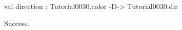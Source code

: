 \runverbatimtrue
{}
\begin{RunVerbatimMsg}
val direction : Tutorial0030.color -D-> Tutorial0030.dir
\end{RunVerbatimMsg}
\begin{RunVerbatimErr}
Success.
\end{RunVerbatimErr}
